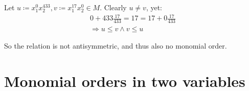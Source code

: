 \documentclass[a4paper]{scrreprt}
\begin{document}
Let $u \coloneqq x_1^0 x_2^{433}, v \coloneqq x_1^{17} x_2^0 \in M$. Clearly $u \neq v$, yet:
\begin{align*}
		0 + 433 \frac{17}{433} = 17 = 17 + 0 \frac{17}{433} \\
		\Rightarrow u \leq v \land v \leq u
\end{align*}

So the relation is not antisymmetric, and thus also no monomial order.


\section{Monomial orders in two variables}

\printbibliography{}
\end{document}
